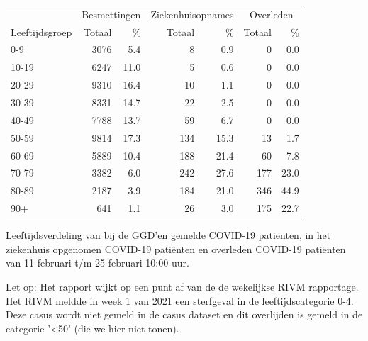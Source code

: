 \documentclass[
  english,
  man,floatsintext]{apa6}
\begin{document}
\begin{table}[H]
\centering\begingroup\fontsize{11}{13}\selectfont

\begin{threeparttable}
\begin{tabular}{lrrrrrr}
\toprule
\multicolumn{1}{c}{ } & \multicolumn{2}{c}{Besmettingen} & \multicolumn{2}{c}{Ziekenhuisopnames} & \multicolumn{2}{c}{Overleden} \\
\cmidrule(l{3pt}r{3pt}){2-3} \cmidrule(l{3pt}r{3pt}){4-5} \cmidrule(l{3pt}r{3pt}){6-7}
Leeftijdsgroep & Totaal & \% & Totaal & \% & Totaal & \%\\
\midrule
0-9 & 3076 & 5.4 & 8 & 0.9 & 0 & 0.0\\
10-19 & 6247 & 11.0 & 5 & 0.6 & 0 & 0.0\\
20-29 & 9310 & 16.4 & 10 & 1.1 & 0 & 0.0\\
30-39 & 8331 & 14.7 & 22 & 2.5 & 0 & 0.0\\
40-49 & 7788 & 13.7 & 59 & 6.7 & 0 & 0.0\\
50-59 & 9814 & 17.3 & 134 & 15.3 & 13 & 1.7\\
60-69 & 5889 & 10.4 & 188 & 21.4 & 60 & 7.8\\
70-79 & 3382 & 6.0 & 242 & 27.6 & 177 & 23.0\\
80-89 & 2187 & 3.9 & 184 & 21.0 & 346 & 44.9\\
90+ & 641 & 1.1 & 26 & 3.0 & 175 & 22.7\\
\bottomrule
\end{tabular}
\begin{tablenotes}
\item[1] Leeftijdsverdeling van bij de GGD’en gemelde COVID-19 patiënten, in het ziekenhuis opgenomen COVID-19 patiënten en overleden COVID-19 patiënten van 11 februari t/m 25 februari 10:00 uur.
\item[2] Let op: Het rapport wijkt op een punt af van de de wekelijkse RIVM rapportage. Het RIVM meldde in week 1 van 2021 een sterfgeval in de leeftijdscategorie 0-4. Deze casus wordt niet gemeld in de casus dataset en dit overlijden is gemeld in de categorie '<50' (die we hier niet tonen).
\end{tablenotes}
\end{threeparttable}
\endgroup{}
\end{table}

\newpage
\end{document}
